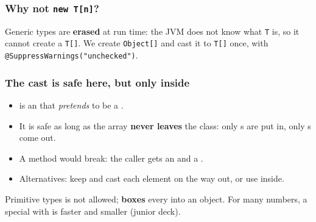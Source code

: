 \documentclass[aspectratio=169,10pt,compress]{beamer}
\begin{document}




\begin{frame}[t,fragile] \frametitle{Why not \texttt{new T[n]}?}

  \vspace{0.2em}
  \small Generic types are \textbf{erased} at run time: the JVM does not know what \texttt{T} is, so it cannot create a \texttt{T[]}.
  We create \texttt{Object[]} and cast it to \texttt{T[]} once, with \texttt{@SuppressWarnings("unchecked")}.
\end{frame}




\begin{frame}[t,fragile] \frametitle{The cast is safe here, but only inside}
  \begin{itemize}
    \item {} is an  that \emph{pretends} to be a .
    \item It is safe as long as the array \textbf{never leaves} the class: only s are put in, only s come out.
    \item A method  would break: the caller gets an  and a .
    \item Alternatives: keep  and cast each element on the way out, or use  inside.
  \end{itemize}
  \begin{block}{Primitive types}
    \small {} is not allowed;  \textbf{boxes} every  into an object.
    For many numbers, a special  with  is faster and smaller (junior deck).
  \end{block}
\end{frame}

\end{document}
